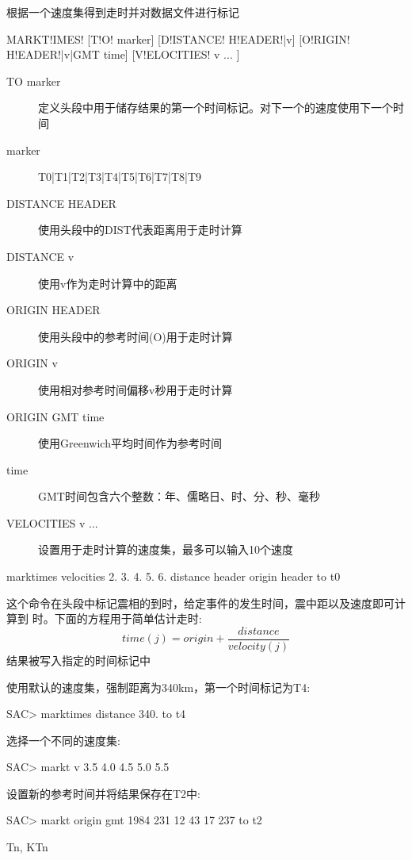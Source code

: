 \label{cmd:marktimes}

根据一个速度集得到走时并对数据文件进行标记

\begin{SACSTX}
MARKT!IMES! [T!O! marker] [D!ISTANCE! H!EADER!|v] [O!RIGIN! H!EADER!|v|GMT time]
    [V!ELOCITIES! v ... ]
\end{SACSTX}

\begin{description}
\item [TO marker] 定义头段中用于储存结果的第一个时间标记。对下一个的速度使用下一个时间
\item [marker]  T0|T1|T2|T3|T4|T5|T6|T7|T8|T9
\item [DISTANCE HEADER] 使用头段中的DIST代表距离用于走时计算
\item [DISTANCE v] 使用v作为走时计算中的距离
\item [ORIGIN HEADER] 使用头段中的参考时间(O)用于走时计算
\item [ORIGIN v] 使用相对参考时间偏移v秒用于走时计算
\item [ORIGIN GMT time] 使用Greenwich平均时间作为参考时间
\item [time] GMT时间包含六个整数：年、儒略日、时、分、秒、毫秒
\item [VELOCITIES v ... ] 设置用于走时计算的速度集，最多可以输入10个速度
\end{description}

\begin{SACDFT}
marktimes velocities 2. 3. 4. 5. 6. distance
    header origin header to t0
\end{SACDFT}

这个命令在头段中标记震相的到时，给定事件的发生时间，震中距以及速度即可计算到	时。下面的方程用于简单估计走时:
 		\[ time(j) = origin + \frac{distance}{velocity(j)} \]
结果被写入指定的时间标记中

使用默认的速度集，强制距离为340km，第一个时间标记为T4:
\begin{SACCode}
SAC> marktimes distance 340. to t4
\end{SACCode}

选择一个不同的速度集:
\begin{SACCode}
SAC> markt v 3.5 4.0 4.5 5.0 5.5
\end{SACCode}

设置新的参考时间并将结果保存在T2中:
\begin{SACCode}
SAC> markt origin gmt 1984 231 12 43 17 237 to t2
\end{SACCode}

Tn, KTn
